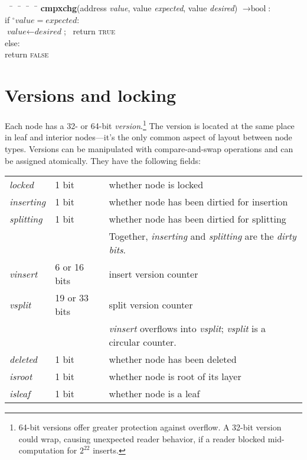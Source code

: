 \documentclass[11pt]{article}
\makeatletter
\newcommand{\FALSE}{\textsc{false}}
\newcommand{\TRUE}{\textsc{true}}
\newcommand{\V}[1]{\textit{#1}}
\newcommand{\readnow}[1]{\ensuremath{{}^\circ#1}}
\newcommand{\Returns}[1]{\ensuremath{\rightarrow\text{#1}}}
\newenvironment{programtabbing}%
  {\begingroup\parskip\z@\begin{tabbing}\quad\qquad~~\= \quad~~\= \quad~~\= \quad~~\=\kill}%
  {\unskip\end{tabbing}\endgroup}
\makeatother
\begin{document}
\begin{programtabbing}
\textbf{cmpxchg}(address \V{value}, value \V{expected}, value
\V{desired}) \Returns{bool}: \\
\> if \(\readnow{\V{value}} = \V{expected}\): \\
\>\> \(\V{value} \gets \V{desired}\);~ return \TRUE \\
\> else: \\
\>\> return \FALSE
\end{programtabbing}

\section{Versions and locking}

Each node has a 32- or 64-bit \emph{version}.\footnote{64-bit versions
offer greater protection against overflow. A 32-bit version could wrap,
causing unexpected reader behavior, if a reader blocked mid-computation
for \(2^{22}\) inserts.} The version is located at the same place in
leaf and interior nodes---it's the only common aspect of layout between
node types. Versions can be manipulated with compare-and-swap operations
and can be assigned atomically. They have the following fields:

\begin{flushleft}
\begin{tabular}{@{}lll}
\V{locked} & 1 bit & whether node is locked \\
\V{inserting} & 1 bit & whether node has been dirtied for insertion \\
\V{splitting} & 1 bit & whether node has been dirtied for splitting \\
&& Together, \V{inserting} and \V{splitting} are the \emph{dirty bits}. \\
\V{vinsert} & 6 or 16 bits & insert version counter \\
\V{vsplit} & 19 or 33 bits & split version counter \\
&& \V{vinsert} overflows into \V{vsplit}; \V{vsplit} is a circular
counter. \\
\V{deleted} & 1 bit & whether node has been deleted \\
\V{isroot} & 1 bit & whether node is root of its layer \\
\V{isleaf} & 1 bit & whether node is a leaf \\
\end{tabular}
\end{flushleft}
\end{document}

